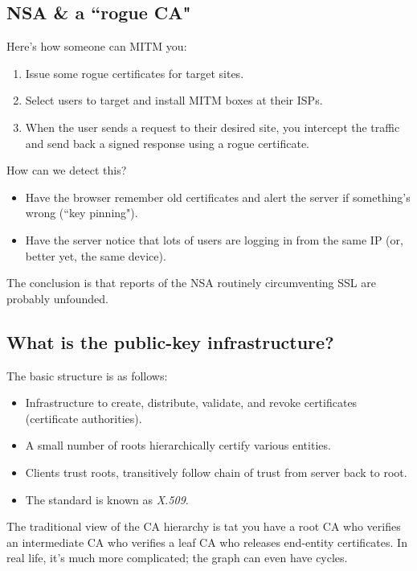 \documentclass[12pt]{article}
\begin{document}
\subsection*{NSA \& a ``rogue CA"}

Here's how someone can MITM you:
\begin{enumerate}
\item Issue some rogue certificates for target sites.
\item Select users to target and install MITM boxes at their ISPs.
\item When the user sends a request to their desired site, you intercept the traffic and send back a signed response using a rogue certificate.
\end{enumerate}

How can we detect this?
\begin{itemize}
\item Have the browser remember old certificates and alert the server if something's wrong (``key pinning").
\item Have the server notice that lots of users are logging in from the same IP (or, better yet, the same device).
\end{itemize}

The conclusion is that reports of the NSA routinely circumventing SSL are probably unfounded.

\subsection*{What is the public-key infrastructure?}

The basic structure is as follows:
\begin{itemize}
\item Infrastructure to create, distribute, validate, and revoke certificates (certificate authorities).
\item A small number of roots hierarchically certify various entities.
\item Clients trust roots, transitively follow chain of trust from server back to root.
\item The standard is known as \textit{X.509}.
\end{itemize}

The traditional view of the CA hierarchy is tat you have a root CA who verifies an intermediate CA who verifies a leaf CA who releases end-entity certificates. In real life, it's much more complicated; the graph can even have cycles.
\end{document}
